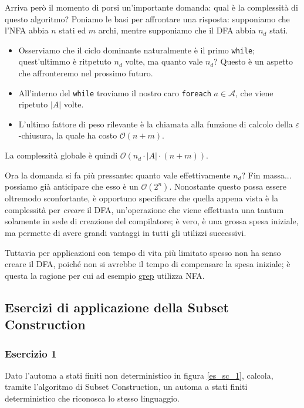 \documentclass[class=book, crop=false, oneside, 12pt]{standalone}
\begin{document}
Arriva però il momento di porsi un'importante domanda: qual è la complessità di questo algoritmo?
Poniamo le basi per affrontare una risposta: supponiamo che l’NFA abbia \(n\) stati ed \(m\) archi, mentre supponiamo che il DFA abbia \(n_d\) stati.
\begin{itemize}
    \item Osserviamo che il ciclo dominante naturalmente è il primo \texttt{while}; quest'ultimmo  è ritpetuto \(n_d\) volte, ma quanto vale \(n_d\)? Questo è un aspetto che affronteremo nel prossimo futuro.
    \item All'interno del \texttt{while} troviamo il nostro caro \texttt{foreach} \(a \in \mathcal{A}\), che viene ripetuto \(|A|\) volte.
    \item L'ultimo fattore di peso rilevante è la chiamata alla funzione di calcolo della \(\varepsilon\)-chiusura, la quale ha costo \(\mathcal{O}(n+m)\).
\end{itemize}
La complessità globale è quindi \( \mathcal{O}(n_d \cdot |A| \cdot (n+m))\).

Ora la domanda si fa più pressante: quanto vale effettivamente \(n_d\)?
Fin massa... possiamo già anticipare che esso è un \(\mathcal{O}(2^n)\). Nonostante questo possa essere oltremodo sconfortante, è opportuno specificare che quella appena vista è la complessità per \emph{creare} il DFA, un'operazione che viene effettuata una tantum solamente in sede di creazione del compilatore; è vero, è una grossa spesa iniziale, ma permette di avere grandi vantaggi in tutti gli utilizzi successivi.

Tuttavia per applicazioni con tempo di vita più limitato spesso non ha senso creare il DFA, poiché non si avrebbe il tempo di compensare la spesa iniziale; è questa la ragione per cui ad esempio \href{https://it.wikipedia.org/wiki/Grep}{grep} utilizza NFA.


\subsection{Esercizi di applicazione della Subset Construction}
\subsubsection*{Esercizio 1}
Dato l'automa a stati finiti non deterministico in figura \ref{es_sc_1}, calcola, tramite l'algoritmo di Subset Construction, un automa a stati finiti deterministico che riconosca lo stesso linguaggio.
\end{document}
